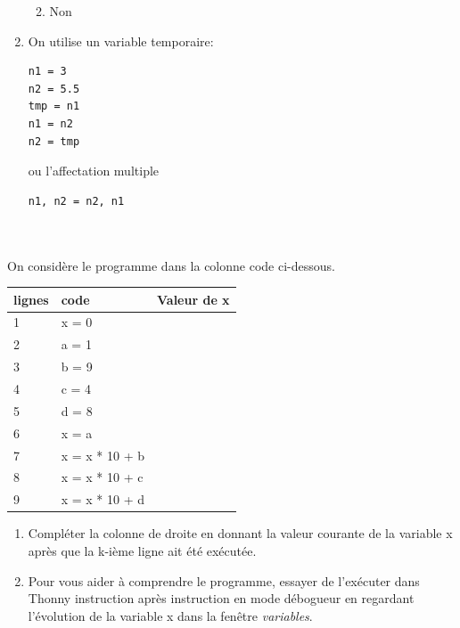 \documentclass[a4paper,12pt]{article}
\begin{document}
\begin{correction}
\begin{enumerate}
\begin{enumerate}[label=\alph*.]
\begin{center}
\begin{tabular}{|l|p{5cm}|p{5cm}|}
				\end{tabular}
			\end{center}
			\item Non	
		\end{enumerate}
		\item  On utilise un variable temporaire:
			\begin{lstlisting}[numbers=none]
n1 = 3
n2 = 5.5
tmp = n1
n1 = n2
n2 = tmp
			\end{lstlisting}
			ou l'affectation multiple
			\begin{lstlisting}[numbers=none]
n1, n2 = n2, n1
			\end{lstlisting}
	\end{enumerate}

\end{correction}
\finexo



\exo{}  ~\\ 
{}  ~\\ 
 On considère le programme dans la colonne code ci-dessous.
\begin{center}
	\begin{tabular}{|l|l|p{5cm}|}
		\hline
		\rowcolor[HTML]{EFEFEF} 
		lignes & code & Valeur de x  \\ \hline
		1&          x =  0&              \\ \hline
		2&          a = 1&              \\ \hline
		3&          b = 9&              \\ \hline
		4&          c = 4&              \\ \hline
		5&          d = 8&              \\ \hline
		6&          x = a&              \\ \hline
		7&          x = x * 10 + b&              \\ \hline
		8&          x = x * 10 + c&              \\ \hline
		9&          x = x * 10 + d&              \\ \hline
	\end{tabular}
\end{center}

\begin{enumerate}[label=\alph*)]
	\item Compléter la colonne de droite en donnant la valeur courante de la variable x après que la k-ième  ligne ait été exécutée.
	\item Pour vous aider à comprendre le programme, essayer de l'exécuter dans Thonny instruction après instruction en mode débogueur en regardant l'évolution de la variable x dans la fenêtre \textit{variables}.
\end{enumerate}
\end{document}
